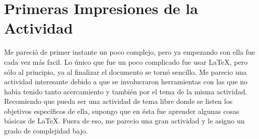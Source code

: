 \documentclass{article}
\begin{document}
\section{Primeras Impresiones de la Actividad}
Me pareció de primer instante un poco complejo, pero ya empezando con ella fue cada vez más facil. Lo único que fue un poco complicado fue usar \LaTeX, pero sólo al principio, ya al finalizar el documento se tornó sencillo. Me parecio una actividad interesante debido a que se involucraron herramientas con las que no habia tenido tanto acercamiento y también por el tema de la misma actividad. Recomiendo que pueda ser una actividad de tema libre donde se listen los objetivos específicos de ella, supongo que en ésta fue aprender algunas cosas básicas de \LaTeX. Fuera de eso, me parecio una gran actividad y le asigno un grado de complejidad bajo.
\end{document}
